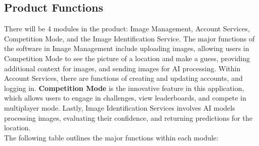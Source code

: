 \documentclass[]{article}
\begin{document}
\subsection{Product Functions}
\label{sub:product_functions}

\noindent There will be 4 modules in the product: Image Management, Account Services, Competition Mode, and the Image Identification Service. The major functions of the software in Image  Management include uploading images, allowing users in Competition Mode to see the picture of a location and make a guess, providing additional context for images, and sending images for AI processing. Within Account Services, there are functions of creating and updating accounts, and logging in. \textbf{Competition Mode} is the innovative feature in this application, which allows users to engage in challenges, view leaderboards, and compete in multiplayer mode. Lastly, Image Identification Services involves AI models processing images, evaluating their confidence, and returning predictions for the location.\\

\noindent The following table outlines the major functions within each module:
\end{document}
